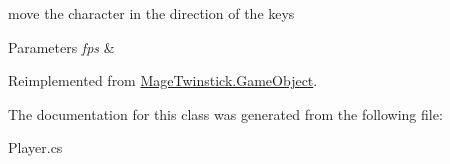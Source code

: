 move the character in the direction of the keys 


\begin{DoxyParams}{Parameters}
{\em fps} & \\
\hline
\end{DoxyParams}


Reimplemented from \hyperlink{class_mage_twinstick_1_1_game_object_a3de8248d06d234f8335525bbb28ccacc}{Mage\+Twinstick.\+Game\+Object}.



The documentation for this class was generated from the following file\+:\begin{DoxyCompactItemize}
\item 
Player.\+cs\end{DoxyCompactItemize}
